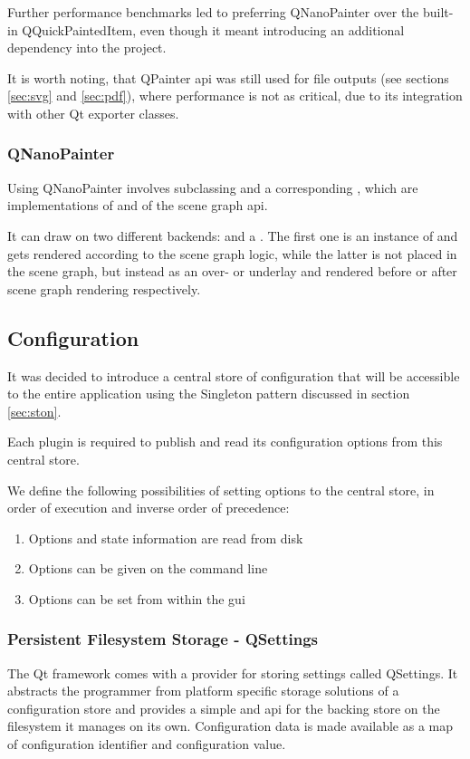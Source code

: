 Further performance benchmarks led to preferring QNanoPainter over the built-in QQuickPaintedItem, even though it meant introducing an additional dependency into the project.

It is worth noting, that QPainter \gls{api} was still used for file outputs (see sections \ref{sec:svg} and \ref{sec:pdf}), where performance is not as critical, due to its integration with other Qt exporter classes.

\subsubsection{QNanoPainter}
\label{sec:qnanopainter}
Using QNanoPainter involves subclassing  and a corresponding , which are implementations of  and  of the scene graph \gls{api}.

It can draw on two different backends:  and a . The first one is an instance of  and gets rendered according to the scene graph logic, while the latter is not placed in the scene graph, but instead as an over- or underlay and rendered before or after scene graph rendering respectively.


\subsection{Configuration}\label{sec:archconf}
It was decided to introduce a central store of configuration that will be accessible to the entire application using the Singleton pattern discussed in section \ref{sec:ston}.

Each plugin is required to publish and read its configuration options from this central store.

We define the following possibilities of setting options to the central store, in order of execution and inverse order of precedence:
\begin{enumerate}
	\item Options and state information are read from disk
	\item Options can be given on the command line
	\item Options can be set from within the \gls{gui}
\end{enumerate}

\subsubsection{Persistent Filesystem Storage - QSettings}
The Qt framework comes with a provider for storing settings called QSettings. It abstracts the programmer from platform specific storage solutions of a configuration store and provides a simple  and  \gls{api} for the backing store on the filesystem it manages on its own. Configuration data is made available as a map of configuration identifier and configuration value.

